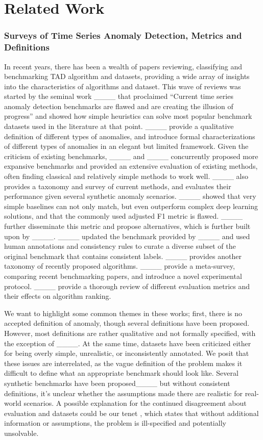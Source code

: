 \section{Related Work}
\subsubsection{Surveys of Time Series Anomaly Detection, Metrics and Definitions}\label{sec:surveys}
In recent years, there has been a wealth of papers reviewing, classifying and benchmarking TAD algorithm and datasets, providing a wide array of insights into the characteristics of algorithms and dataset.
This wave of reviews was started by the seminal work ____ that proclaimed ``Current time series anomaly detection benchmarks are flawed and are creating the illusion of progress'' and showed how simple heuristics can solve most popular benchmark datasets used in the literature at that point.
____ provide a qualitative definition of different types of anomalies, and introduce formal characterizations of different types of anomalies in an elegant but limited framework.
Given the criticism of existing benchmarks, ____ and ____ concurrently proposed more expansive benchmarks and provided an extensive evaluation of existing methods, often finding classical and relatively simple methods to work well. ____ also provides a taxonomy and survey of current methods, and evaluates their performance given several synthetic anomaly scenarios. ____ showed that very simple baselines can not only match, but even outperform complex deep learning solutions, and that the commonly used adjusted F1 metric is flawed. ____ further disseminate this metric and propose alternatives, which is further built upon by ____.
____ updated the benchmark provided by ____ and used human annotations and consistency rules to curate a diverse subset of the original benchmark that contains consistent labels. 
____ provides another taxonomy of recently proposed algorithms. ____ provide a meta-survey, comparing recent benchmarking papers, and introduce a novel experimental protocol.
____ provide a thorough review of different evaluation metrics and their effects on algorithm ranking.

We want to highlight some common themes in these works; first, there is no accepted definition of anomaly, though several definitions have been proposed. However, most definitions are rather qualitative and not formally specified, with the exception of ____. At the same time, datasets have been criticized either for being overly simple, unrealistic, or inconsistently annotated. We posit that these issues are interrelated, as the vague definition of the problem makes it difficult to define what an appropriate benchmark should look like. Several synthetic benchmarks have been proposed____ but without consistent definitions, it's unclear whether the assumptions made there are realistic for real-world scenarios.
A possible explanation for the continued disagreement about evaluation and datasets could be our tenet \applicationspecific, which states that without additional information or assumptions, the problem is ill-specified and potentially unsolvable.

